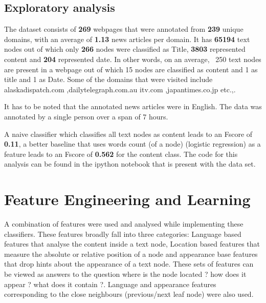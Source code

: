 \documentclass{article} %
\begin{document}

\subsection{Exploratory analysis}
The dataset consists of \textbf{269} webpages that were annotated from \textbf{239} unique domains, with an average of \textbf{1.13} news articles per domain. It has \textbf{65194} text nodes out of which only \textbf{266} nodes were classified as Title, \textbf{3803} represented content and \textbf{204} represented date. In other words, on an average, ~250 text nodes are present in a webpage out of which 15 nodes are classified as content and 1 as title and 1 as Date. Some of the domains that were visited include alaskadispatch.com ,dailytelegraph.com.au itv.com ,japantimes.co.jp etc.,. 

It has to be noted that the annotated news articles were in English. The data was annotated by a single person over a span of 7 hours.

A naive classifier which classifies all text nodes as content leads to an Fscore of \textbf{0.11}, a better baseline that uses words count (of a node) (logistic regression) as a feature leads to an Fscore of \textbf{0.562} for the content class. The code for this analysis can be found in the ipython notebook that is present with the data set.\\





\section{Feature Engineering and Learning}
\label{sec:feat}
A combination of features were used and analysed while implementing these classifiers. These features broadly fall into three categories: Language based features that analyse the content inside a text node, Location based features that measure the absolute or relative position of a node and appearance base features that drop hints about the appearance of a text node. These sets of features can be viewed as answers to the question where is the node located ? how does it appear ?  what does it contain ?. Language and appearance features corresponding to the close neighbours (previous/next leaf node) were also used.
\end{document}

